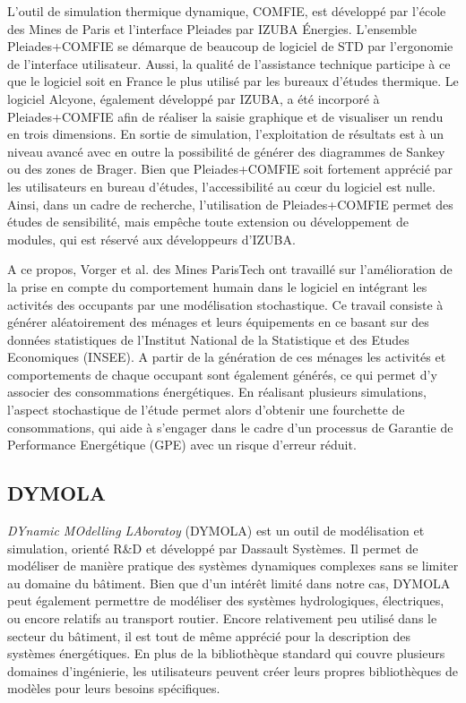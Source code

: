 L'outil de simulation thermique dynamique, COMFIE, est développé par l'école des Mines de Paris et l'interface Pleiades par IZUBA Énergies. L'ensemble Pleiades+COMFIE se démarque de beaucoup de logiciel de STD par l'ergonomie de l'interface utilisateur. Aussi, la qualité de l'assistance technique participe à ce que le logiciel soit en France le plus utilisé par les bureaux d'études thermique. Le logiciel Alcyone, également développé par IZUBA, a été incorporé à Pleiades+COMFIE afin de réaliser la saisie graphique et de visualiser un rendu en trois dimensions. En sortie de simulation, l'exploitation de résultats est à un niveau avancé avec en outre la possibilité de générer des diagrammes de Sankey ou des zones de Brager. Bien que Pleiades+COMFIE soit fortement apprécié par les utilisateurs en bureau d'études, l'accessibilité au cœur du logiciel est nulle. Ainsi, dans un cadre de recherche, l'utilisation de Pleiades+COMFIE permet des études de sensibilité, mais empêche toute extension ou développement de modules, qui est réservé aux développeurs d'IZUBA. 

A ce propos, Vorger et al. \cite{Vorger-14} des Mines ParisTech ont travaillé sur l'amélioration de la prise en compte du comportement humain dans le logiciel en intégrant les activités des occupants par une modélisation stochastique. Ce travail consiste à générer aléatoirement des ménages et leurs équipements en ce basant sur des données statistiques de l'Institut National de la Statistique et des Etudes Economiques (INSEE). A partir de la génération de ces ménages les activités et comportements de chaque occupant sont également générés, ce qui permet d'y associer des consommations énergétiques. En réalisant plusieurs simulations, l'aspect stochastique de l'étude permet alors d'obtenir une fourchette de consommations, qui aide à s'engager dans le cadre d'un processus de Garantie de Performance Energétique (GPE) avec un risque d'erreur réduit.

\subsection*{DYMOLA}

\textit{DYnamic MOdelling LAboratoy} (DYMOLA) est un outil de modélisation et simulation, orienté R\&D et développé par Dassault Systèmes. Il permet de modéliser de manière pratique des systèmes dynamiques complexes sans se limiter au domaine du bâtiment. Bien que d'un intérêt limité dans notre cas, DYMOLA peut également permettre de modéliser des systèmes hydrologiques, électriques, ou encore relatifs au transport routier. Encore relativement peu utilisé dans le secteur du bâtiment, il est tout de même apprécié pour la description des systèmes énergétiques. En plus de la bibliothèque standard qui couvre plusieurs domaines d'ingénierie, les utilisateurs peuvent créer leurs propres bibliothèques de modèles pour leurs besoins spécifiques. 

